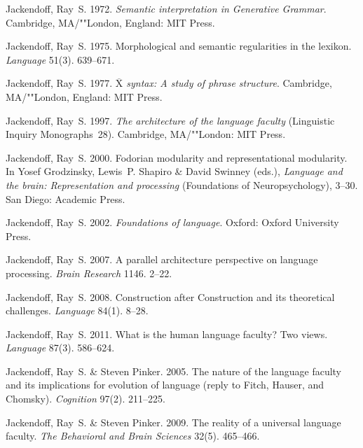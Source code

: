 \begin{thebibliography}{1420}
Jackendoff, Ray~S. 1972.
\newblock \emph{Semantic interpretation in {Generative Grammar}}.
\newblock Cambridge, MA/""London, England: MIT Press.

Jackendoff, Ray~S. 1975.
\newblock Morphological and semantic regularities in the lexikon.
\newblock \emph{Language} 51(3). 639--671.

Jackendoff, Ray~S. 1977.
\newblock \emph{{$\overline{\mbox{X}}$} syntax: {A} study of phrase structure}.
\newblock Cambridge, MA/""London, England: MIT Press.

Jackendoff, Ray~S. 1997.
\newblock \emph{The architecture of the language faculty} (Linguistic Inquiry
  Monographs~28).
\newblock Cambridge, MA/""London: MIT Press.

Jackendoff, Ray~S. 2000.
\newblock Fodorian modularity and representational modularity.
\newblock In Yosef Grodzinsky, Lewis~P. Shapiro \& David Swinney (eds.),
  \emph{Language and the brain: {Representation} and processing}  (Foundations
  of Neuropsychology), 3--30. San Diego: Academic Press.

Jackendoff, Ray~S. 2002.
\newblock \emph{Foundations of language}.
\newblock Oxford: Oxford University Press.

Jackendoff, Ray~S. 2007.
\newblock A parallel architecture perspective on language processing.
\newblock \emph{Brain Research} 1146. 2--22.

Jackendoff, Ray~S. 2008.
\newblock Construction after {Construction} and its theoretical challenges.
\newblock \emph{Language} 84(1). 8--28.

Jackendoff, Ray~S. 2011.
\newblock What is the human language faculty? {Two} views.
\newblock \emph{Language} 87(3). 586--624.

Jackendoff, Ray~S. \& Steven Pinker. 2005.
\newblock The nature of the language faculty and its implications for evolution
  of language (reply to {Fitch, Hauser, and Chomsky}).
\newblock \emph{Cognition} 97(2). 211--225.

Jackendoff, Ray~S. \& Steven Pinker. 2009.
\newblock The reality of a universal language faculty.
\newblock \emph{The Behavioral and Brain Sciences} 32(5). 465--466.


\end{thebibliography}
